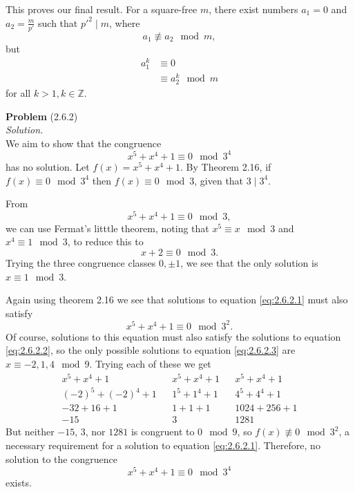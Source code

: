 \documentclass[12 pt]{amsart}
\begin{document}
  This proves our final result. 
  For a square-free $m$, there exist numbers
  $a_1 = 0$ and $a_2 = \frac{m}{p'}$ such that 
  $p'^2 \mid m$, where
  \[
    a_1 \not \equiv a_2 \mod m,
  \]
  but 
  \begin{align*}
    a_1^k &\equiv 0 \\
          &\equiv a_2^k \mod m 
  \end{align*}
  for all $k > 1, k \in \mathbb{Z}$.
\vfill
\newpage



\phantom{\quad} \vfill
\noindent
\textbf{Problem} (2.6.2) \\[4ex]
\emph{Solution.} \\[2ex]
  We aim to show that 
  the congruence
  \begin{equation}
    \label{eq:2.6.2.1}
    x^5 + x^4 + 1 \equiv 0 \mod 3^4
  \end{equation}
  has no solution.
  Let $f(x) = x^5 + x^4 + 1$.
  By Theorem 2.16, if $f(x) \equiv 0 \mod 3^4$ then
  $f(x) \equiv 0 \mod 3$, given that $3 \mid 3^4$.

  From 
  \begin{equation}
    \label{eq:2.6.2.2}
    x^5 + x^4 + 1 \equiv 0 \mod 3, 
  \end{equation}
  we can use Fermat's litttle theorem, noting that 
  $x^5 \equiv x \mod 3$ and $x^4 \equiv 1 \mod 3$, to reduce this
  to 
  \[
    x + 2 \equiv 0 \mod 3.
  \]
  Trying the three congruence classes $0, \pm 1$, we see that
  the only solution is $x \equiv 1 \mod 3$.

  Again using theorem 2.16 we see that solutions to  equation
  \ref{eq:2.6.2.1} must also satisfy 
  \begin{equation}
    \label{eq:2.6.2.3}
    x^5 + x^4 + 1 \equiv 0 \mod 3^2. 
  \end{equation}
  Of course, solutions to this equation must also satisfy 
  the solutions to equation \ref{eq:2.6.2.2}, so the only possible solutions
  to equation \ref{eq:2.6.2.3} are $x \equiv -2,1,4 \mod 9$.
  Trying each of these we get
  \begin{align*}
    x^5 + x^4 + 1 & & x^5 + x^4 + 1 & & x^5 + x^4 + 1 \\
    (-2)^5 + (-2)^4 + 1 && 1^5 + 1^4 + 1 && 4^5 + 4^4 + 1 \\
    -32 + 16 + 1 && 1 + 1 + 1 && 1024 + 256 + 1 \\
    -15 && 3 && 1281
  \end{align*}
  But neither $-15$, $3$, nor $1281$ is congruent to $0 \mod 9$, so 
  $f(x) \not \equiv 0 \mod 3^2$, a necessary requirement for a solution
  to equation \ref{eq:2.6.2.1}.
  Therefore, no solution to the congruence
  \[
    x^5 + x^4 + 1 \equiv 0 \mod 3^4
  \]
  exists. 
\vfill
\newpage
\end{document}

